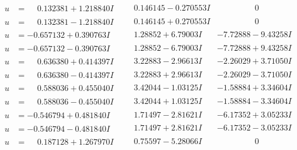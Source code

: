 \documentclass[1p]{elsarticle_modified}
\theoremstyle{definition}
\begin{document}
$$\begin{array}{c|c|c}
\begin{aligned}
u &= \phantom{-}0.132381 + 1.218840 I\end{aligned}
 & \phantom{-}0.146145 - 0.270553 I & \phantom{-0.000000 } 0 \\ \hline\begin{aligned}
u &= \phantom{-}0.132381 - 1.218840 I\end{aligned}
 & \phantom{-}0.146145 + 0.270553 I & \phantom{-0.000000 } 0 \\ \hline\begin{aligned}
u &= -0.657132 + 0.390763 I\end{aligned}
 & \phantom{-}1.28852 + 6.79003 I & -7.72888 - 9.43258 I \\ \hline\begin{aligned}
u &= -0.657132 - 0.390763 I\end{aligned}
 & \phantom{-}1.28852 - 6.79003 I & -7.72888 + 9.43258 I \\ \hline\begin{aligned}
u &= \phantom{-}0.636380 + 0.414397 I\end{aligned}
 & \phantom{-}3.22883 - 2.96613 I & -2.26029 + 3.71050 I \\ \hline\begin{aligned}
u &= \phantom{-}0.636380 - 0.414397 I\end{aligned}
 & \phantom{-}3.22883 + 2.96613 I & -2.26029 - 3.71050 I \\ \hline\begin{aligned}
u &= \phantom{-}0.588036 + 0.455040 I\end{aligned}
 & \phantom{-}3.42044 - 1.03125 I & -1.58884 + 3.34604 I \\ \hline\begin{aligned}
u &= \phantom{-}0.588036 - 0.455040 I\end{aligned}
 & \phantom{-}3.42044 + 1.03125 I & -1.58884 - 3.34604 I \\ \hline\begin{aligned}
u &= -0.546794 + 0.481840 I\end{aligned}
 & \phantom{-}1.71497 - 2.81621 I & -6.17352 + 3.05233 I \\ \hline\begin{aligned}
u &= -0.546794 - 0.481840 I\end{aligned}
 & \phantom{-}1.71497 + 2.81621 I & -6.17352 - 3.05233 I \\ \hline\begin{aligned}
u &= \phantom{-}0.187128 + 1.267970 I\end{aligned}
 & \phantom{-}0.75597 - 5.28066 I & \phantom{-0.000000 } 0 \\ \hline\begin{aligned}

\end{aligned}
\end{array}$$
\end{document}

